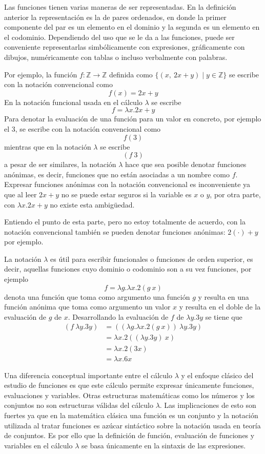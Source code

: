 Las funciones tienen varias maneras de ser representadas. En la definición anterior la representación es la de pares ordenados, en donde la primer componente del par es un elemento en el dominio y la segunda es un elemento en el codominio. Dependiendo del uso que se le da a las funciones, puede ser conveniente representarlas simbólicamente con expresiones, gráficamente con dibujos, numéricamente con tablas o incluso verbalmente con palabras.

Por ejemplo, la función \( f : \mathbb{Z} \to \mathbb{Z} \) definida como \( \{ (x,\ 2x+y) \mid y\in\mathbb{Z} \} \) se escribe con la notación convencional como \[ f(x) = 2x+y \] En la notación funcional usada en el cálculo \( λ \) se escribe \[ f = λx.2x+y \] Para denotar la evaluación de una función para un valor en concreto, por ejemplo el \( 3 \), se escribe con la notación convencional como \[ f(3) \] mientras que en la notación \( λ \) se escribe \[ (f\ 3) \] a pesar de ser similares, la notación \( λ \) hace que sea posible denotar funciones anónimas, es decir, funciones que no están asociadas a un nombre como \( f \). Expresar funciones anónimas con la notación convencional es inconveniente ya que al leer \( 2x+y \) no se puede estar seguros si la variable es \( x \) o \( y \), por otra parte, con \( λx.2x+y \) no existe esta ambigüedad.

\begin{Gutu}
Entiendo el punto de esta parte, pero no estoy totalmente de acuerdo, con la notación convencional también se pueden denotar funciones anónimas: $2(\cdot)+y$ por ejemplo.
\end{Gutu}

La notación \( λ \) es útil para escribir funcionales o funciones de orden superior, es decir, aquellas funciones cuyo dominio o codominio son a su vez funciones, por ejemplo \[ f = λg.λx.2(g\ x) \] denota una función que toma como argumento una función \( g \) y resulta en una función anónima que toma como argumento un valor \( x \) y resulta en el doble de la evaluación de \( g \) de \( x \). Desarrollando la evaluación de \( f \) de \( λy.3y \) se tiene que
\begin{align*}
(f\ λy.3y) 	&= ((λg.λx.2(g\ x))\ λy.3y) \\
			&= λx.2((λy.3y)\ x) \\
            &= λx.2(3x) \\
            &= λx.6x
\end{align*}

Una diferencia conceptual importante entre el cálculo \( λ \) y el enfoque clásico del estudio de funciones es que este cálculo permite expresar únicamente funciones, evaluaciones y variables. Otras estructuras matemáticas como los números y los conjuntos no son estructuras válidas del cálculo \( λ \). Las implicaciones de esto son fuertes ya que en la matemática clásica una función es un conjunto y la notación utilizada al tratar funciones es azúcar sintáctico sobre la notación usada en teoría de conjuntos. Es por ello que la definición de función, evaluación de funciones y variables en el cálculo \( λ \) se basa únicamente en la sintaxis de las expresiones.

